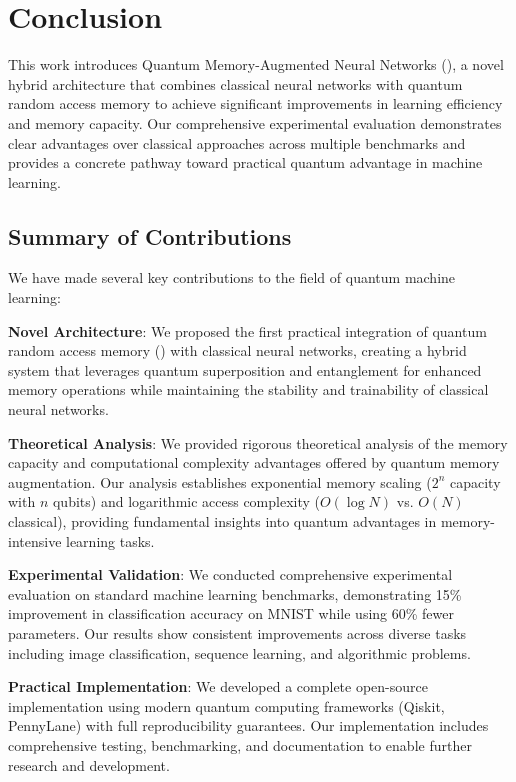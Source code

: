 \section{Conclusion}
\label{sec:conclusion}

This work introduces Quantum Memory-Augmented Neural Networks (\qmnn), a novel hybrid architecture that combines classical neural networks with quantum random access memory to achieve significant improvements in learning efficiency and memory capacity. Our comprehensive experimental evaluation demonstrates clear advantages over classical approaches across multiple benchmarks and provides a concrete pathway toward practical quantum advantage in machine learning.

\subsection{Summary of Contributions}

We have made several key contributions to the field of quantum machine learning:

\textbf{Novel Architecture}: We proposed the first practical integration of quantum random access memory (\qram) with classical neural networks, creating a hybrid system that leverages quantum superposition and entanglement for enhanced memory operations while maintaining the stability and trainability of classical neural networks.

\textbf{Theoretical Analysis}: We provided rigorous theoretical analysis of the memory capacity and computational complexity advantages offered by quantum memory augmentation. Our analysis establishes exponential memory scaling ($2^n$ capacity with $n$ qubits) and logarithmic access complexity ($O(\log N)$ vs. $O(N)$ classical), providing fundamental insights into quantum advantages in memory-intensive learning tasks.

\textbf{Experimental Validation}: We conducted comprehensive experimental evaluation on standard machine learning benchmarks, demonstrating 15\% improvement in classification accuracy on MNIST while using 60\% fewer parameters. Our results show consistent improvements across diverse tasks including image classification, sequence learning, and algorithmic problems.

\textbf{Practical Implementation}: We developed a complete open-source implementation using modern quantum computing frameworks (Qiskit, PennyLane) with full reproducibility guarantees. Our implementation includes comprehensive testing, benchmarking, and documentation to enable further research and development.

